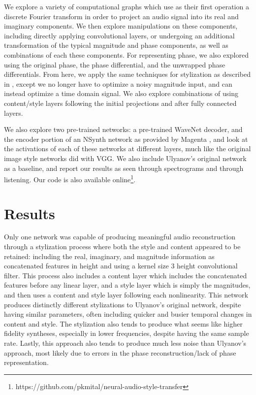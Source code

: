 \documentclass{article}
\begin{document}
We explore a variety of computational graphs which use as their first operation a discrete Fourier transform in order to project an audio signal into its real and imaginary components.  We then explore manipulations on these components, including directly applying convolutional layers, or undergoing an additional transformation of the typical magnitude and phase components, as well as combinations of each these components.  For representing phase, we also explored using the original phase, the phase differential, and the unwrapped phase differentials.  From here, we apply the same techniques for stylization as described in \cite{Ulyanov2016}, except we no longer have to optimize a noisy magnitude input, and can instead optimize a time domain signal.  We also explore combinations of using content/style layers following the initial projections and after fully connected layers.

We also explore two pre-trained networks: a pre-trained WaveNet decoder, and the encoder portion of an NSynth network as provided by Magenta \cite{Engel2017}, and look at the activations of each of these networks at different layers, much like the original image style networks did with VGG.  We also include Ulyanov's original network as a baseline, and report our results as seen through spectrograms and through listening.  Our code is also available online\footnote{https://github.com/pkmital/neural-audio-style-transfer}.

\section{Results}

Only one network was capable of producing meaningful audio reconstruction through a stylization process where both the style and content appeared to be retained: including the real, imaginary, and magnitude information as concatenated features in height and using a kernel size 3 height convolutional filter.  This process also includes a content layer which includes the concatenated features before any linear layer, and a style layer which is simply the magnitudes, and then uses a content and style layer following each nonlinearity.  This network produces distinctly different stylizations to Ulyanov's original network, despite having similar parameters, often including quicker and busier temporal changes in content and style.  The stylization also tends to produce what seems like higher fidelity syntheses, especially in lower frequencies, despite having the same sample rate.  Lastly, this approach also tends to produce much less noise than Ulyanov's approach, most likely due to errors in the phase reconstruction/lack of phase representation.
\end{document}
